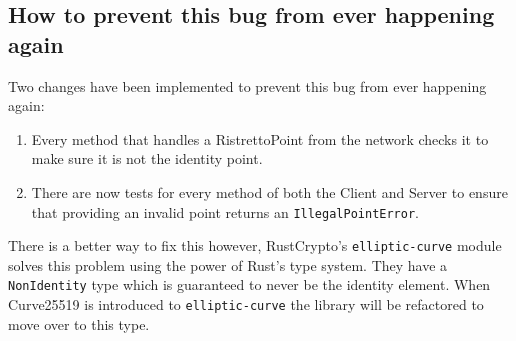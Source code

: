 \subsection{How to prevent this bug from ever happening again}
Two changes have been implemented to prevent this bug from ever happening again:
\begin{enumerate}
  \item{Every method that handles a RistrettoPoint from the network checks it to make sure it is not the identity point.}
  \item{There are now tests for every method of both the Client and Server to ensure that providing an invalid point returns an \texttt{IllegalPointError}.}
\end{enumerate}

There is a better way to fix this however, RustCrypto's \texttt{elliptic-curve} module solves this problem using the power of Rust's type system.
They have a \texttt{NonIdentity} type which is guaranteed to never be the identity element.
When Curve25519 is introduced to \texttt{elliptic-curve} the library will be refactored to move over to this type.

